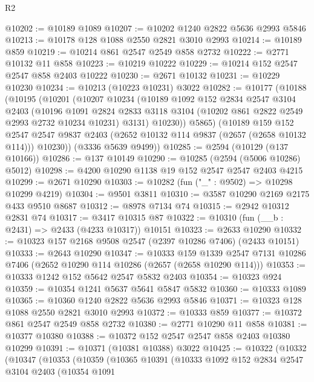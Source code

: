 \begin{lexlean}{R2}
\begin{coremodule}
@10202 := @10189 @1089
@10207 := @10202 @1240 @2822 @5636 @2993 @5846
@10213 := @10178 @128 @1088 @2550 @2821 @3010 @2993
@10214 := @10189 @859
@10219 := @10214 @861 @2547 @2549 @858 @2732
@10222 := @2771 @10132 @11 @858
@10223 := @10219 @10222
@10229 := @10214 @152 @2547 @2547 @858 @2403 @10222
@10230 := @2671 @10132
@10231 := @10229 @10230
@10234 := @10213 (@10223 @10231) @3022
@10282 := @10177
    (@10188
      (@10195
        (@10201
          (@10207
            @10234
            (@10189
              @1092
              @152
              @2834
              @2547
              @3104
              @2403
              (@10196
                @1091
                @2824
                @2833
                @3118
                @3104
                (@10202 @861 @2822 @2549 @2993 @2732 @10234 @10231)
                @3131)
              @10230))
          @5865)
        (@10189
          @159
          @152
          @2547
          @2547
          @9837
          @2403
          (@2652 @10132 @114 @9837 (@2657 (@2658 @10132 @114)))
          @10230))
      (@3336 @5639 @9499))
@10285 := @2594 (@10129 (@137 @10166))
@10286 := @137 @10149
@10290 := @10285 (@2594 (@5006 @10286) @5012)
@10298 := @4200 @10290 @1138 @19 @152 @2547 @2547 @2403 @4215
@10299 := @2671 @10290
@10303 := @10282 (fun ("_" : @9502) => @10298 @10299 @4219)
@10304 := @9501 @3811
@10310 := @3587 @10290 @2169 @2175 @433 @9510 @8687
@10312 := @8978 @7134 @74
@10315 := @2942 @10312 @2831 @74
@10317 := @3417 @10315 @87
@10322 := @10310 (fun (__b : @2431) => @2433 (@4233 @10317)) @10151
@10323 := @2633 @10290
@10332 := @10323 @157 @2168 @9508 @2547 (@2397 @10286 @7406) (@2433 @10151)
@10333 := @2643 @10290
@10347 := @10333
    @159
    @1339
    @2547
    @7131
    @10286
    @7406
    (@2652 @10290 @114 @10286 (@2657 (@2658 @10290 @114)))
@10353 := @10333 @1242 @152 @5642 @2547 @5832 @2403
@10354 := @10323 @924
@10359 := @10354 @1241 @5637 @5641 @5847 @5832
@10360 := @10333 @1089
@10365 := @10360 @1240 @2822 @5636 @2993 @5846
@10371 := @10323 @128 @1088 @2550 @2821 @3010 @2993
@10372 := @10333 @859
@10377 := @10372 @861 @2547 @2549 @858 @2732
@10380 := @2771 @10290 @11 @858
@10381 := @10377 @10380
@10388 := @10372 @152 @2547 @2547 @858 @2403 @10380 @10299
@10391 := @10371 (@10381 @10388) @3022
@10425 := @10322
    (@10332
      (@10347
        (@10353
          (@10359
            (@10365
              @10391
              (@10333
                @1092
                @152
                @2834
                @2547
                @3104
                @2403
                (@10354
                  @1091

\end{coremodule}
\end{lexlean}
